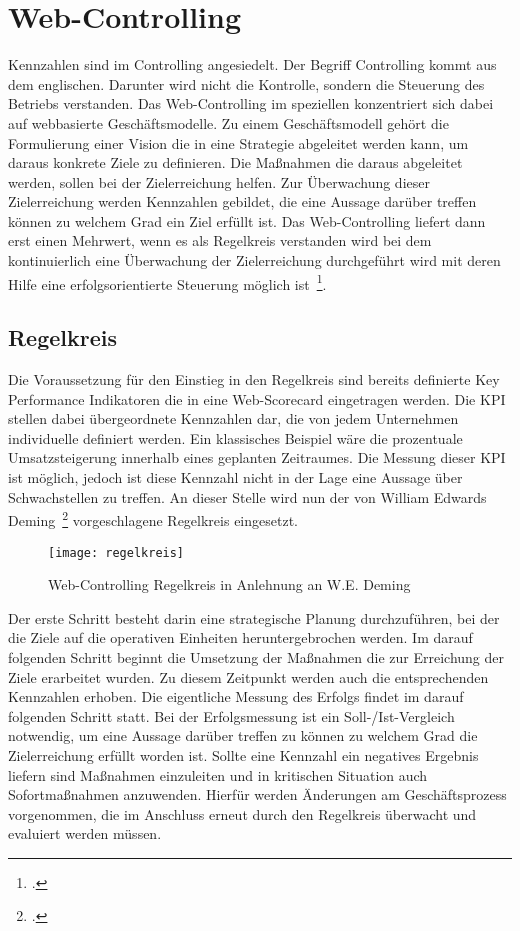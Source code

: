 \newpage
\section{Web-Controlling}
Kennzahlen sind im Controlling angesiedelt. Der Begriff Controlling kommt aus dem englischen. Darunter wird nicht die Kontrolle, sondern die Steuerung des Betriebs verstanden. Das Web-Controlling im speziellen konzentriert sich dabei auf webbasierte Geschäftsmodelle. Zu einem Geschäftsmodell gehört die Formulierung einer Vision die in eine Strategie abgeleitet werden kann, um daraus konkrete Ziele zu definieren. Die Maßnahmen die daraus abgeleitet werden, sollen bei der Zielerreichung helfen. Zur Überwachung dieser Zielerreichung werden Kennzahlen gebildet, die eine Aussage darüber treffen können zu welchem Grad ein Ziel erfüllt ist. Das Web-Controlling liefert dann erst einen Mehrwert, wenn es als Regelkreis verstanden wird bei dem kontinuierlich eine Überwachung der Zielerreichung durchgeführt wird mit deren Hilfe eine erfolgsorientierte Steuerung möglich ist~\footcite[Vgl. ][Seite 83]{Stahl.2009}. 

\subsection{Regelkreis}
Die Voraussetzung für den Einstieg in den Regelkreis sind bereits definierte Key Performance Indikatoren die in eine Web-Scorecard eingetragen werden. Die KPI stellen dabei übergeordnete Kennzahlen dar, die von jedem Unternehmen individuelle definiert werden. Ein klassisches Beispiel wäre die prozentuale Umsatzsteigerung innerhalb eines geplanten Zeitraumes. Die Messung dieser KPI ist möglich, jedoch ist diese Kennzahl nicht in der Lage eine Aussage über Schwachstellen zu treffen. An dieser Stelle wird nun der von William Edwards Deming~\footcite[Vgl. ][Seite 45]{Deming.1986} vorgeschlagene Regelkreis eingesetzt. 

\begin{figure}[H]
	\begin{center}
		\texttt{[image: regelkreis]}
		\caption{Web-Controlling Regelkreis in Anlehnung an W.E. Deming}
	\end{center}
\end{figure}

Der erste Schritt besteht darin eine strategische Planung durchzuführen, bei der die Ziele auf die operativen Einheiten heruntergebrochen werden. Im darauf folgenden Schritt beginnt die Umsetzung der Maßnahmen die zur Erreichung der Ziele erarbeitet wurden. Zu diesem Zeitpunkt werden auch die entsprechenden Kennzahlen erhoben. Die eigentliche Messung des Erfolgs findet im darauf folgenden Schritt statt. Bei der Erfolgsmessung ist ein Soll-/Ist-Vergleich notwendig, um eine Aussage darüber treffen zu können zu welchem Grad die Zielerreichung erfüllt worden ist. Sollte eine Kennzahl ein negatives Ergebnis liefern sind Maßnahmen einzuleiten und in kritischen Situation auch Sofortmaßnahmen anzuwenden. Hierfür werden Änderungen am Geschäftsprozess vorgenommen, die im Anschluss erneut durch den Regelkreis überwacht und evaluiert werden müssen.

